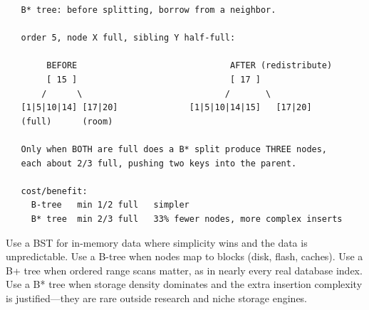 \begin{verbatim}
   B* tree: before splitting, borrow from a neighbor.

   order 5, node X full, sibling Y half-full:

        BEFORE                              AFTER (redistribute)
        [ 15 ]                              [ 17 ]
       /      \                            /       \
   [1|5|10|14] [17|20]              [1|5|10|14|15]   [17|20]
   (full)      (room)

   Only when BOTH are full does a B* split produce THREE nodes,
   each about 2/3 full, pushing two keys into the parent.

   cost/benefit:
     B-tree   min 1/2 full   simpler
     B* tree  min 2/3 full   33% fewer nodes, more complex inserts
\end{verbatim}

\begin{ruleofthumb}
Use a BST for in-memory data where simplicity wins and the data is
unpredictable. Use a B-tree when nodes map to blocks (disk, flash,
caches). Use a B+ tree when ordered range scans matter, as in nearly
every real database index. Use a B* tree when storage density
dominates and the extra insertion complexity is justified---they are
rare outside research and niche storage engines.
\end{ruleofthumb}

